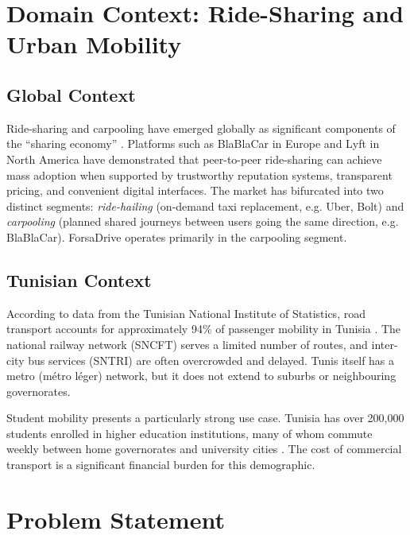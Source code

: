 \documentclass[12pt,a4paper,openright]{report}
\begin{document}
\section{Domain Context: Ride-Sharing and Urban Mobility}

\subsection{Global Context}

Ride-sharing and carpooling have emerged globally as significant components of the ``sharing economy'' \cite{botsman2010}. Platforms such as BlaBlaCar in Europe and Lyft in North America have demonstrated that peer-to-peer ride-sharing can achieve mass adoption when supported by trustworthy reputation systems, transparent pricing, and convenient digital interfaces. The market has bifurcated into two distinct segments: \textit{ride-hailing} (on-demand taxi replacement, e.g. Uber, Bolt) and \textit{carpooling} (planned shared journeys between users going the same direction, e.g. BlaBlaCar). ForsaDrive operates primarily in the carpooling segment.

\subsection{Tunisian Context}

According to data from the Tunisian National Institute of Statistics, road transport accounts for approximately 94\% of passenger mobility in Tunisia \cite{ins_transport}. The national railway network (SNCFT) serves a limited number of routes, and inter-city bus services (SNTRI) are often overcrowded and delayed. Tunis itself has a metro (métro léger) network, but it does not extend to suburbs or neighbouring governorates.

Student mobility presents a particularly strong use case. Tunisia has over 200,000 students enrolled in higher education institutions, many of whom commute weekly between home governorates and university cities \cite{mes_statistics}. The cost of commercial transport is a significant financial burden for this demographic.

\section{Problem Statement}
\end{document}

